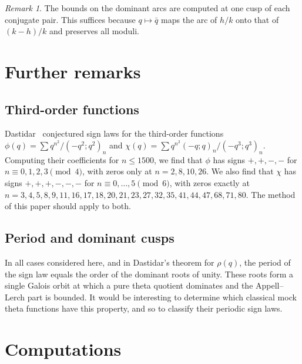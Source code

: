 \documentclass[11pt]{amsart}
\theoremstyle{definition}
\theoremstyle{remark}
\newtheorem{remark}[theorem]{Remark}
\numberwithin{equation}{section}
\begin{document}
\begin{remark}
The bounds on the dominant arcs are computed at one cusp of each conjugate pair.
This suffices because $q\mapsto\bar q$ maps the arc of $h/k$ onto that of $(k-h)/k$ and preserves all moduli.
\end{remark}

\section{Further remarks}\label{sec:remarks}

\subsection*{Third-order functions}
Dastidar~\cite{Da} conjectured sign laws for the third-order functions $\phi(q)=\sum q^{n^2}/(-q^2;q^2)_n$ and $\chi(q)=\sum q^{n^2}(-q;q)_n/(-q^3;q^3)_n$.
Computing their coefficients for $n\le1500$, we find that $\phi$ has signs $+,+,-,-$ for $n\equiv0,1,2,3\pmod4$, with zeros only at $n=2,8,10,26$.
We also find that $\chi$ has signs $+,+,+,-,-,-$ for $n\equiv0,\dots,5\pmod 6$, with zeros exactly at $n=3,4,5,8,9,11,16,17,18,20,21,23,27,32,35,41,44,47,68,71,80$.
The method of this paper should apply to both.

\subsection*{Period and dominant cusps}
In all cases considered here, and in Dastidar's theorem for $\rho(q)$, the period of the sign law equals the order of the dominant roots of unity.
These roots form a single Galois orbit at which a pure theta quotient dominates and the Appell--Lerch part is bounded.
It would be interesting to determine which classical mock theta functions have this property, and so to classify their periodic sign laws.

\appendix
\sloppy
\section{Computations}\label{app:code}
\end{document}
